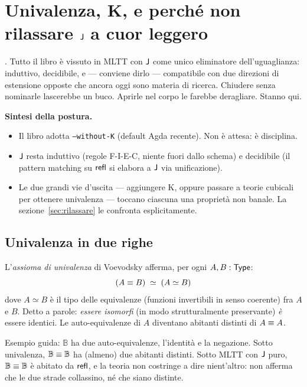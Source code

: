 
\chapter{Univalenza, K, e perch\'e non rilassare $\mathsf{J}$ a cuor leggero}\label{cap:univalenza}

. Tutto il libro \`e vissuto in MLTT con $\mathsf{J}$ come unico eliminatore dell'uguaglianza: induttivo, decidibile, e --- conviene dirlo --- compatibile con due direzioni di estensione opposte che ancora oggi sono materia di ricerca. Chiudere senza nominarle lascerebbe un buco. Aprirle nel corpo le farebbe deragliare. Stanno qui.

\bigskip

\noindent\textbf{Sintesi della postura.}
\begin{itemize}
\item Il libro adotta \texttt{--without-K} (default Agda recente). Non \`e attesa: \`e disciplina.
\item $\mathsf{J}$ resta induttivo (regole F-I-E-C, niente fuori dallo schema) e decidibile (il pattern matching su $\mathsf{refl}$ si elabora a $\mathsf{J}$ via unificazione).
\item Le due grandi vie d'uscita --- aggiungere K, oppure passare a teorie cubicali per ottenere univalenza --- toccano ciascuna una propriet\`a non banale. La sezione~\ref{sec:rilassare} le confronta esplicitamente.
\end{itemize}

\section*{Univalenza in due righe}

L'\emph{assioma di univalenza} di Voevodsky afferma, per ogni $A, B : \mathsf{Type}$:
\[
(A \equiv B) \;\simeq\; (A \simeq B)
\]
\noindent dove $A \simeq B$ \`e il tipo delle equivalenze (funzioni invertibili in senso coerente) fra $A$ e $B$. Detto a parole: \emph{essere isomorfi} (in modo strutturalmente preservante) \emph{\`e} essere identici. Le auto-equivalenze di $A$ diventano abitanti distinti di $A \equiv A$.

Esempio guida: $\mathbb{B}$ ha due auto-equivalenze, l'identit\`a e la negazione. Sotto univalenza, $\mathbb{B} \equiv \mathbb{B}$ ha (almeno) due abitanti distinti. Sotto MLTT con $\mathsf{J}$ puro, $\mathbb{B} \equiv \mathbb{B}$ \`e abitato da $\mathsf{refl}$, e la teoria non costringe a dire nient'altro: non afferma che le due strade collassino, n\'e che siano distinte.

